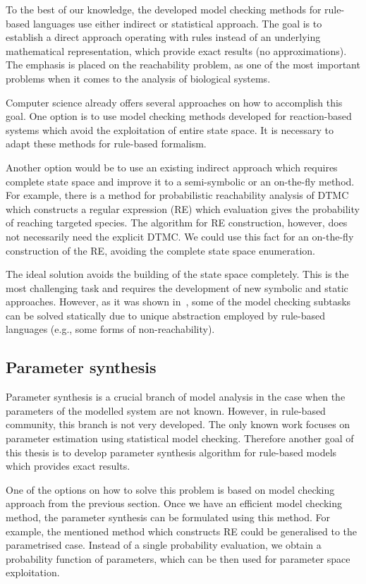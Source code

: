 \documentclass[11pt,a4paper]{report}
\begin{document}
To the best of our knowledge, the developed model checking methods for rule-based languages use either indirect or statistical approach. The goal is to establish a direct approach operating with rules instead of an underlying mathematical representation, which provide exact results (no approximations). The emphasis is placed on the reachability problem, as one of the most important problems when it comes to the analysis of biological systems.

Computer science already offers several approaches on how to accomplish this goal. One option is to use model checking methods developed for reaction-based systems which avoid the exploitation of entire state space. It is necessary to adapt these methods for rule-based formalism.

Another option would be to use an existing indirect approach which requires complete state space and improve it to a semi-symbolic or an on-the-fly method. For example, there is a method for probabilistic reachability analysis of DTMC which constructs a regular expression (RE) which evaluation gives the probability of reaching targeted species. The algorithm for RE construction, however, does not necessarily need the explicit DTMC. We could use this fact for an on-the-fly construction of the RE, avoiding the complete state space enumeration.

The ideal solution avoids the building of the state space completely. This is the most challenging task and requires the development of new symbolic and static approaches. However, as it was shown in~\cite{trojak2018sasb}, some of the model checking subtasks can be solved statically due to unique abstraction employed by rule-based languages (e.g., some forms of non-reachability).

\subsection{Parameter synthesis}

Parameter synthesis is a crucial branch of model analysis in the case when the parameters of the modelled system are not known. However, in rule-based community, this branch is not very developed. The only known work focuses on parameter estimation using statistical model checking. Therefore another goal of this thesis is to develop parameter synthesis algorithm for rule-based models which provides exact results.

One of the options on how to solve this problem is based on model checking approach from the previous section. Once we have an efficient model checking method, the parameter synthesis can be formulated using this method. For example, the mentioned method which constructs RE could be generalised to the parametrised case. Instead of a single probability evaluation, we obtain a probability function of parameters, which can be then used for parameter space exploitation.
\end{document}
